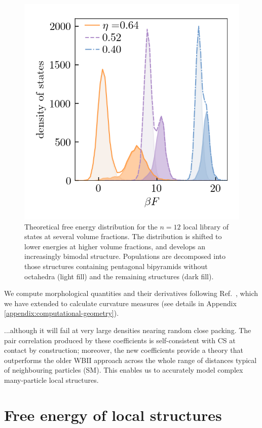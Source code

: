 \documentclass[11pt,twoside]{report}
\begin{document}
\begin{figure}
  \includegraphics[width=0.9\linewidth,outer]{n12-dos}
  \caption[Free energy distribution of 12 particle structures]{
    Theoretical free energy distribution for the $n=12$ local library of states at several volume fractions.
    The distribution is shifted to lower energies at higher volume fractions, and develops an increasingly bimodal structure.
    Populations are decomposed into those structures containing pentagonal bipyramids without octahedra (light fill) and the remaining structures (dark fill).
  }
  \label{fig:n12-dos}
\end{figure}

We compute morphological quantities and their derivatives following Ref.\ \cite{KleninJCC2011}, which we have extended to calculate curvature measures (see details in Appendix \ref{appendix:computational-geometry}).

...although it will fail at very large densities nearing random close packing.
The pair correlation produced by these coefficients is self-consistent with CS at contact by construction; moreover, the new coefficients provide a theory that outperforms the older WBII approach across the whole range of distances typical of neighbouring particles (SM).
This enables us to accurately model complex many-particle local structures.

\section{Free energy of local structures}
\end{document}
